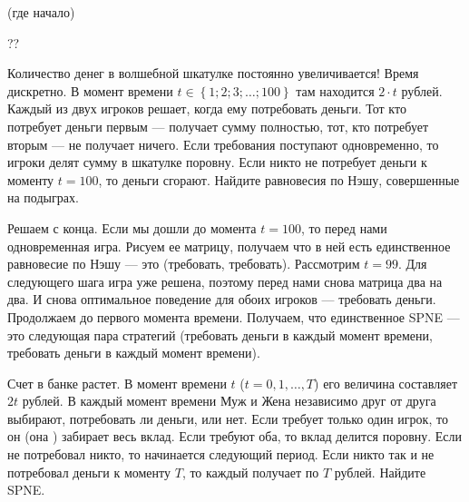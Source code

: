 \begin{problem} (где начало)
\begin{source}
\cite[2.111]{osborne:igt}??
\end{source}
Количество денег в волшебной шкатулке постоянно увеличивается! Время дискретно. В момент времени  $t\in \left\{1;2;3;\ldots ;100\right\}$  там находится  $2\cdot t$  рублей. Каждый из двух игроков решает, когда ему потребовать деньги. Тот кто потребует деньги первым --- получает сумму полностью, тот, кто потребует вторым --- не получает ничего. Если требования поступают одновременно, то игроки делят сумму в шкатулке поровну. Если никто не потребует деньги к моменту  $t=100$, то деньги сгорают. Найдите равновесия по Нэшу, совершенные на подыграх.\par

\begin{sol}
Решаем с конца. Если мы дошли до момента $t=100$, то перед нами одновременная игра. Рисуем ее матрицу, получаем что в ней есть единственное равновесие по Нэшу --- это (требовать, требовать). Рассмотрим $t=99$. Для следующего шага игра уже решена, поэтому перед нами снова матрица два на два. И снова оптимальное поведение для обоих игроков --- требовать деньги. Продолжаем до первого момента времени. Получаем, что единственное SPNE --- это следующая пара стратегий (требовать деньги в каждый момент времени, требовать деньги в каждый момент времени).
\end{sol}
\end{problem}






\begin{problem}
 Счет в банке растет. В момент времени $t$ ($t=0,1,\ldots,T$) его
величина составляет $2t$ рублей. В каждый момент времени Муж и
Жена независимо друг от друга выбирают, потребовать ли деньги, или
нет. Если требует только один игрок, то он (она ) забирает весь
вклад. Если требуют оба, то вклад делится поровну. Если не
потребовал никто, то начинается следующий период. Если никто так и
не потребовал деньги к моменту $T$, то каждый получает по $T$
рублей. Найдите SPNE.

\begin{sol}

\end{sol}
\end{problem}




